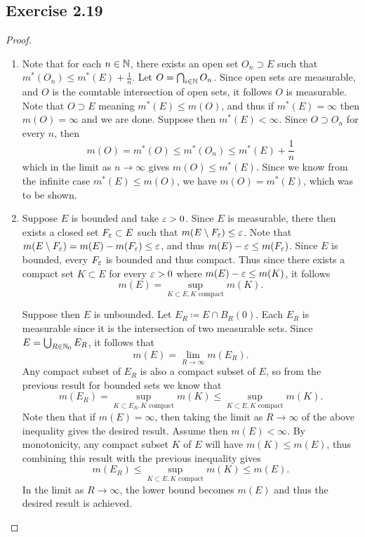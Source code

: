\documentclass[hw_all.tex]{subfiles}
\begin{document}
\subsection{Exercise 2.19}

\begin{proof}
    \begin{enumerate}
        \item 
            Note that for each $n \in \mathbb{N}$, there exists an open set $O_n \supset E$ such that $m^*(O_n) \leq m^*(E) + \frac{1}{n}$. Let $O = \bigcap_{i \in \mathbb{N}} O_n$. Since open sets are measurable, and $O$ is the countable intersection of open sets, it follows $O$ is measurable. Note that $O \supset E$ meaning $m^*(E) \leq m(O)$, and thus if $m^*(E) = \infty$ then $m(O) = \infty$ and we are done. Suppose then $m^*(E) < \infty$. Since $O \supset O_n$ for every $n$, then 
            \[
                m(O) = m^*(O) \leq m^*(O_n) \leq m^*(E) + \frac{1}{n}
            \]
            which in the limit as $n \to \infty$ gives $m(O) \leq m^*(E)$. Since we know from the infinite case $m^*(E) \leq m(O)$, we have $m(O) = m^*(E)$, which was to be shown.

        \item
            Suppose $E$ is bounded and take $\varepsilon > 0$. Since $E$ is measurable, there then exists a closed set $F_\varepsilon \subset E$ such that $m(E \setminus F_\varepsilon) \leq \varepsilon$. Note that $m(E \setminus F_\varepsilon) = m(E) - m(F_\varepsilon) \leq \varepsilon$, and thus $m(E) - \varepsilon \leq m(F_\varepsilon)$. Since $E$ is bounded, every $F_\varepsilon$ is bounded and thus compact. Thus since there exists a compact set $K \subset E$ for every $\varepsilon > 0$ where $m(E) - \varepsilon \leq m(K)$, it follows
            \[
                m(E) = \sup_{K \subset E, K \text{ compact}} m(K)
            .\]

            Suppose then $E$ is unbounded. Let $E_R \coloneq E \cap B_R(0)$. Each $E_R$ is measurable since it is the intersection of two measurable sets. Since $E = \bigcup_{R \in \mathbb{N}_0} E_R$, it follows that
            \[
                m(E) = \lim_{R \to \infty} m(E_R)
            .\]
            Any compact subset of $E_R$ is also a compact subset of $E$, so from the previous result for bounded sets we know that
            \[
                m(E_R) = \sup_{K \subset E_R, K \text{ compact}} m(K) \leq \sup_{K \subset E, K \text{ compact}} m(K)
            .\]
            Note then that if $m(E) = \infty$, then taking the limit as $R \to \infty$ of the above inequality gives the desired result. Assume then $m(E) < \infty$. By monotonicity, any compact subset $K$ of $E$ will have $m(K) \leq m(E)$, thus combining this result with the previous inequality gives
            \[
                m(E_R) \leq \sup_{K \subset E, K \text{ compact}} m(K) \leq m(E)
            .\]
            In the limit as $R \to \infty$, the lower bound becomes $m(E)$ and thus the desired result is achieved.
    \end{enumerate}
\end{proof}
\end{document}
